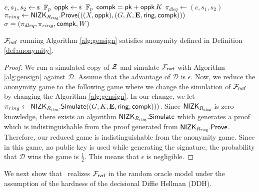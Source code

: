 \begin{algorithm}
	\caption{$\gen_{sign}(\ring,W,\pk,m)$}
	\label{alg:gensign}	 	
	\begin{algorithmic}[1]
		\State $ c,s_1, s_2 \leftsample \FF_p $
		\State $ \openpk \leftsample \FF_p $
		\State $ \mathsf{compk} =  \mathsf{pk} + \mathsf{oppk} \, K$
		\State $ \pi_{dleq}  \leftarrow (c,s_1, s_2)$
		\State $ \pi_{ring} \leftarrow {\ensuremath{\mathsf{NIZK}}}_{R_{\mathtt{ring}}}.{\mathsf{Prove}}(((X, \mathsf{oppk}),(G,K,{\mathbf{E}},\mathsf{ring}, \mathsf{compk}))) $ 
		\State\Return$ \sigma = (\pi_{dleq},\pi_{ring},\mathsf{compk},W) $
	\end{algorithmic}
	
\end{algorithm}


\begin{lemma} $ \mathcal{F}_{\textsf{rvrf}} $ running Algorithm \ref{alg:gensign} satisfies anonymity defined in Definition \ref{def:anonymity}.
\end{lemma}

\begin{proof}
	We run a simulated copy of $ \mathcal{Z} $ and simulate $ \mathcal{F}_{\textsf{rvrf}} $ with Algorithm \ref{alg:gensign} against $ \mathcal{D} $. Assume that the advantage of $ \mathcal{D} $ is $ \epsilon $. Now, we reduce the anonymity game to the following game where we change the simulation of $ \mathcal{F}_{\textsf{rvrf}} $ by changing the Algorithm \ref{alg:gensign}. In our change, we let $ \pi_{ring} \leftarrow {\ensuremath{\mathsf{NIZK}}}_{R_{\mathtt{ring}}}.\mathsf{Simulate}((G,K,{\mathbf{E}},\mathsf{ring}, \mathsf{compk}))) $. Since $ {\mathsf{NIZK}}_{R_{\mathtt{ring}}} $ is zero knowledge, there exists an algorithm  $ {\mathsf{NIZK}}_{R_{\mathtt{ring}}}.\mathsf{Simulate} $ which generates a proof which is indistinguishable from the proof generated from $ {\mathsf{NIZK}}_{R_{\mathtt{ring}}}.{\mathsf{Prove}} $. Therefore, our reduced game is indistinguishable from the anonymity game. Since in this game, no public key is used while generating the signature, the probability that  $ \mathcal{D} $ wins the game is $ \frac{1}{2} $. This means that $ \epsilon $ is negligible.		
\end{proof}

We next show that \name \ realizes $ \mathcal{F}_{\textsf{rvrf}} $  in the random oracle model under the assumption of the hardness of the decisional Diffie Hellman (DDH).


